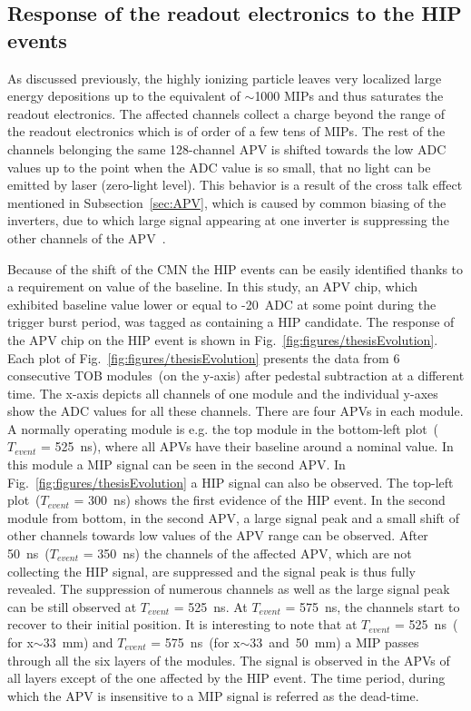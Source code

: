 
\subsection{Response of the readout electronics to the HIP events}

As discussed previously, the highly ionizing particle leaves very localized large energy depositions up to the equivalent of $\sim$1000 MIPs and thus saturates the readout electronics. The affected channels collect a charge beyond the range of the readout electronics which is of order of a few tens of MIPs. The rest of the channels belonging the same 128-channel APV is shifted towards the low ADC values up to the point when the ADC value is so small, that no light can be emitted by laser (zero-light level). This behavior is a result of the cross talk effect mentioned in Subsection~\ref{sec:APV}, which is caused by common biasing of the inverters, due to which large signal appearing at one inverter is suppressing the other channels of the APV~\cite{Bainbridge:2004jc}. 

Because of the shift of the CMN the HIP events can be easily identified thanks to a requirement on value of the baseline. In this study, an APV chip, which exhibited baseline value lower or equal to -20~ADC at some point during the trigger burst period, was tagged as containing a  HIP candidate. The response of the APV chip on the HIP event is shown in Fig.~\ref{fig:figures/thesisEvolution}. Each plot of Fig.~\ref{fig:figures/thesisEvolution} presents the data from 6 consecutive TOB modules~(on the y-axis) after pedestal subtraction at a different time. The x-axis depicts all channels of one module and the individual y-axes show the ADC values for all these channels. There are four APVs in each module. A normally operating module is e.g. the top module in the bottom-left plot~($T_{event}$ = 525~ns), where all APVs have their baseline around a nominal value. In this module a MIP signal can be seen in the second APV. In Fig.~\ref{fig:figures/thesisEvolution} a HIP signal can also be observed. The top-left plot~($T_{event}$ = 300~ns) shows the first evidence of the HIP event. In the second module from bottom, in the second APV, a large signal peak and a small shift of other channels towards low values of the APV range can be observed. After 50~ns~($T_{event}$ = 350~ns) the channels of the affected APV, which are not collecting the HIP signal, are suppressed and the signal peak is thus fully revealed. The suppression of numerous channels as well as the large signal peak can be still observed at $T_{event}$ = 525~ns. At $T_{event}$ = 575~ns, the channels start to recover to their initial position. It is interesting to note that at $T_{event}$ = 525~ns~( for x$\sim$33~mm) and $T_{event}$ = 575~ns~(for x$\sim$33~and~50~mm) a MIP passes through all the six layers of the modules. The signal is observed in the APVs of all layers except of the one affected by the HIP event. The time period, during which the APV is insensitive to a MIP signal is referred as the dead-time.

